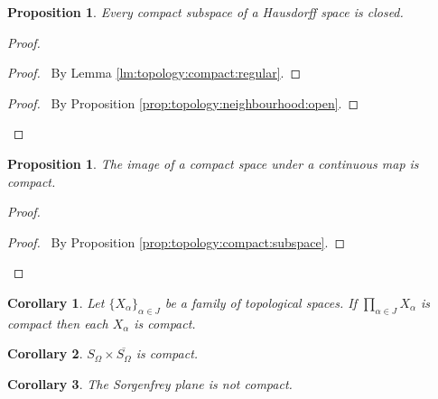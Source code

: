 \documentclass{report}
\let\qed\relax
\newtheorem{prop}[lm]{Proposition}
\newtheorem{cor}{Corollary}[lm]
\theoremstyle{definition}
\begin{document}
  \begin{prop}
    \label{prop:topology:compact:compact_is_closed}
    Every compact subspace of a Hausdorff space is closed.
  \end{prop}

  \begin{proof}
    \pf
    \begin{proof}
      \pf\ By Lemma \ref{lm:topology:compact:regular}.
    \end{proof}
    \qedstep
    \begin{proof}
      \pf\ By Proposition \ref{prop:topology:neighbourhood:open}.
    \end{proof}
  \end{proof}


  \begin{prop}
    \label{prop:topology:compact:image}
    The image of a compact space under a continuous map is compact.
  \end{prop}

  \begin{proof}
    \pf
    \qedstep
    \begin{proof}
      \pf\ By Proposition \ref{prop:topology:compact:subspace}.
    \end{proof}
    \qed
  \end{proof}

  \begin{cor}
    Let $\{ X_\alpha \}_{\alpha \in J}$ be a family of topological spaces. If
    $\prod_{\alpha \in J} X_\alpha$ is compact then each $X_\alpha$ is compact.
  \end{cor}

  \begin{cor}
    $S_\Omega \times \overline{S_\Omega}$ is compact.
  \end{cor}

  \begin{cor}
   The Sorgenfrey plane is not compact.
  \end{cor}
\end{document}
